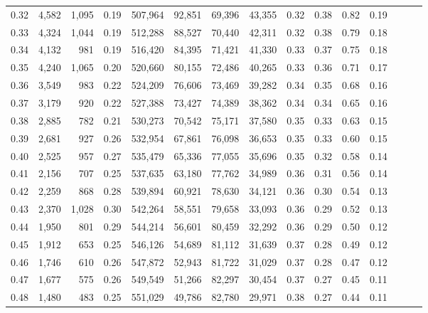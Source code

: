 \begin{tabular}{rrrrrrrrrrrrrrr}
0.32 &   4,582 &  1,095 &  0.19 &  507,964 &   92,851 &   69,396 &   43,355 &  0.32 &  0.38 &  0.82 &      0.19 \\
0.33 &   4,324 &  1,044 &  0.19 &  512,288 &   88,527 &   70,440 &   42,311 &  0.32 &  0.38 &  0.79 &      0.18 \\
0.34 &   4,132 &    981 &  0.19 &  516,420 &   84,395 &   71,421 &   41,330 &  0.33 &  0.37 &  0.75 &      0.18 \\
0.35 &   4,240 &  1,065 &  0.20 &  520,660 &   80,155 &   72,486 &   40,265 &  0.33 &  0.36 &  0.71 &      0.17 \\
0.36 &   3,549 &    983 &  0.22 &  524,209 &   76,606 &   73,469 &   39,282 &  0.34 &  0.35 &  0.68 &      0.16 \\
0.37 &   3,179 &    920 &  0.22 &  527,388 &   73,427 &   74,389 &   38,362 &  0.34 &  0.34 &  0.65 &      0.16 \\
0.38 &   2,885 &    782 &  0.21 &  530,273 &   70,542 &   75,171 &   37,580 &  0.35 &  0.33 &  0.63 &      0.15 \\
0.39 &   2,681 &    927 &  0.26 &  532,954 &   67,861 &   76,098 &   36,653 &  0.35 &  0.33 &  0.60 &      0.15 \\
0.40 &   2,525 &    957 &  0.27 &  535,479 &   65,336 &   77,055 &   35,696 &  0.35 &  0.32 &  0.58 &      0.14 \\
0.41 &   2,156 &    707 &  0.25 &  537,635 &   63,180 &   77,762 &   34,989 &  0.36 &  0.31 &  0.56 &      0.14 \\
0.42 &   2,259 &    868 &  0.28 &  539,894 &   60,921 &   78,630 &   34,121 &  0.36 &  0.30 &  0.54 &      0.13 \\
0.43 &   2,370 &  1,028 &  0.30 &  542,264 &   58,551 &   79,658 &   33,093 &  0.36 &  0.29 &  0.52 &      0.13 \\
0.44 &   1,950 &    801 &  0.29 &  544,214 &   56,601 &   80,459 &   32,292 &  0.36 &  0.29 &  0.50 &      0.12 \\
0.45 &   1,912 &    653 &  0.25 &  546,126 &   54,689 &   81,112 &   31,639 &  0.37 &  0.28 &  0.49 &      0.12 \\
0.46 &   1,746 &    610 &  0.26 &  547,872 &   52,943 &   81,722 &   31,029 &  0.37 &  0.28 &  0.47 &      0.12 \\
0.47 &   1,677 &    575 &  0.26 &  549,549 &   51,266 &   82,297 &   30,454 &  0.37 &  0.27 &  0.45 &      0.11 \\
0.48 &   1,480 &    483 &  0.25 &  551,029 &   49,786 &   82,780 &   29,971 &  0.38 &  0.27 &  0.44 &      0.11 \\

\end{tabular}
